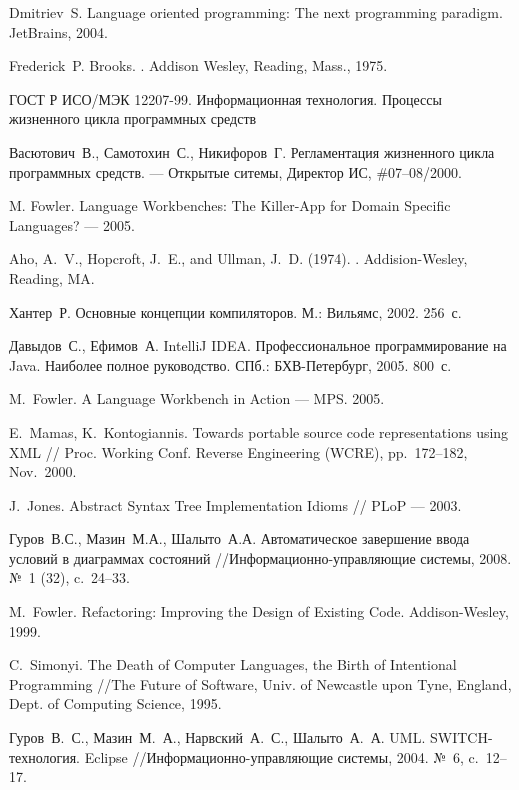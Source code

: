 \documentclass[a4paper,12pt]{article}
\begin{document}
\begin{thebibliography}{99}
Dmitriev~S. Language oriented programming: The next programming paradigm. JetBrains, 2004.

Frederick~P. Brooks.
.
\newblock Addison Wesley, Reading, Mass., 1975.

ГОСТ Р ИСО/МЭК 12207-99. Информационная технология. Процессы жизненного цикла программных средств

Васютович~В., Самотохин~С., Никифоров~Г.
Регламентация жизненного цикла программных средств.
--- Открытые ситемы, Директор ИС, \#07--08/2000.

M. Fowler. Language Workbenches: The Killer-App for Domain Specific Languages? --- 2005.

Aho, A.~V., Hopcroft, J.~E., and Ullman, J.~D. (1974).
.
\newblock Addision-Wesley, Reading, MA.

Хантер~Р. Основные концепции компиляторов. М.: Вильямс, 2002. 256~с.

Давыдов~С., Ефимов~А. IntelliJ IDEA.
Профессиональное программирование на Java. Наиболее полное руководство.
СПб.: БХВ-Петербург, 2005. 800~с.

M.~Fowler.
A Language Workbench in Action --- MPS.
2005.

E.~Mamas, K.~Kontogiannis.
Towards portable source code representations using XML
// Proc. Working Conf. Reverse Engineering (WCRE), pp.~172--182, Nov.~2000.

J.~Jones.
Abstract Syntax Tree Implementation Idioms
// PLoP --- 2003.

Гуров~В.С., Мазин~М.А., Шалыто~А.А.
Автоматическое завершение ввода условий в диаграммах состояний
//Информационно-управляющие системы, 2008. №~1 (32), c.~24--33.

M.~Fowler.
Refactoring: Improving the Design of Existing Code.
Addison-Wesley, 1999.

C.~Simonyi.
The Death of Computer Languages, the Birth of Intentional Programming
//The Future of Software, Univ. of Newcastle upon Tyne, England, Dept. of Computing Science, 1995.

Гуров~В.~С., Мазин~М.~А., Нарвский~А.~С., Шалыто~А.~А.
UML. SWITCH-технология. Eclipse
//Информационно-управляющие системы, 2004. №~6, c.~12--17.


\end{thebibliography}
\end{document}
